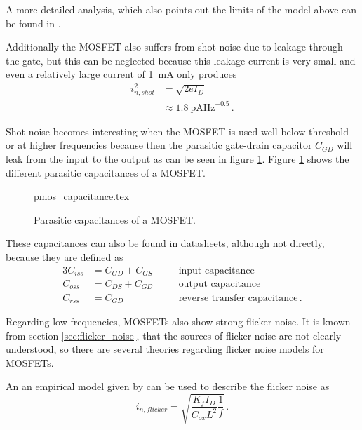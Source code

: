 \documentclass[12pt]{book}
\begin{document}
A more detailed analysis, which also points out the limits of the model above can be found in \cite{mosfet_thermal_noise_details}.

Additionally the MOSFET also suffers from shot noise due to leakage through the gate, but this can be neglected because this leakage current is very small and even a relatively large current of \qty{1}{\mA} only produces
\begin{align}
    i_{n,shot}^2 &= \sqrt{2 e I_D}\\
    &\approx \qty[power-half-as-sqrt, per-mode=symbol]{1.8}{\pA \Hz \tothe{-0.5}} \,.
\end{align}

Shot noise becomes interesting when the MOSFET is used well below threshold or at higher frequencies because then the parasitic gate-drain capacitor $C_{GD}$ will leak from the input to the output as can be seen in figure \ref{fig:mosfet_parasitic_capacitors}. Figure \ref{fig:mosfet_parasitic_capacitors} shows the different parasitic capacitances of a MOSFET.
\begin{figure}[hb]
    \centering
        {pmos_capacitance.tex}
    \caption{Parasitic capacitances of a MOSFET.}
    \label{fig:mosfet_parasitic_capacitors}
\end{figure}

These capacitances can also be found in datasheets, although not directly, because they are defined as
\begin{alignat}{3}
    C_{iss} &= C_{GD} + C_{GS} &\quad&\text{input capacitance}\\
    C_{oss} &= C_{DS} + C_{GD} &\quad&\text{output capacitance}\\
    C_{rss} &= C_{GD} &\quad&\text{reverse transfer capacitance} \,.
\end{alignat}

Regarding low frequencies, MOSFETs also show strong flicker noise. It is known from section \ref{sec:flicker_noise}, that the sources of flicker noise are not clearly understood, so there are several theories regarding flicker noise models for MOSFETs.

An an empirical model given by \cite{mosfet_noise_overview,mosfet_flicker_noise} can be used to describe the flicker noise as
\begin{equation}
    i_{n,flicker} = \sqrt{\frac{K_f I_D}{C_{ox} L^2} \frac{1}{f}}\,.
\end{equation}
\end{document}
